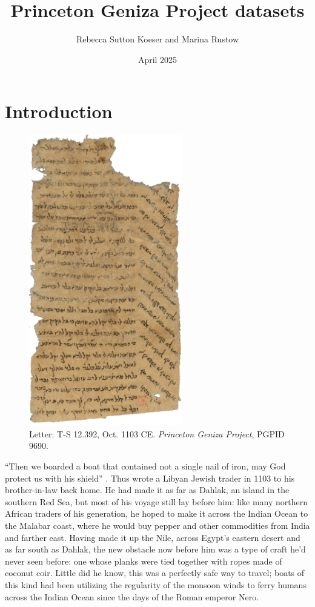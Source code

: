 \documentclass{article}
\title{Princeton Geniza Project datasets}
\author{Rebecca Sutton Koeser and Marina Rustow\footnotemark}
\date{April 2025}
\begin{document}
\maketitle
{}

\section{Introduction}

\begin{figure}[h!]
  \includegraphics[height=5in]{PGPID 9690_T-S_12.392r.png}
  \centering
  \caption{Letter: T-S 12.392, Oct. 1103 CE. \textit{Princeton Geniza Project}, PGPID 9690.}
  \label{fig:pgpid9690}
\end{figure}


“Then we boarded a boat that contained not a single nail of iron, may God protect us with his shield” \autocite{noauthor_letter_1103}. Thus wrote a Libyan Jewish trader in 1103 to his brother-in-law back home. He had made it as far as Dahlak, an island in the southern Red Sea, but most of his voyage still lay before him: like many northern African traders of his generation, he hoped to make it across the Indian Ocean to the Malabar coast, where he would buy pepper and other commodities from India and farther east. Having made it up the Nile, across Egypt’s eastern desert and as far south as Dahlak, the new obstacle now before him was a type of craft he’d never seen before: one whose planks were tied together with ropes made of coconut coir. Little did he know, this was a perfectly safe way to travel; boats of this kind had been utilizing the regularity of the monsoon winds to ferry humans across the Indian Ocean since the days of the Roman emperor Nero.
\end{document}
